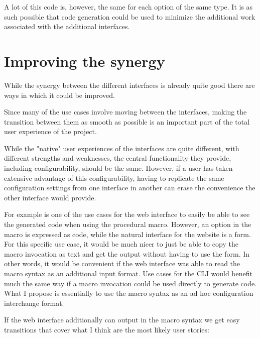 A lot of this code is, however, the same for each option of the same type. It is as such possible that code generation could be used to minimize the additional work associated with the additional interfaces.



\section{Improving the synergy}
\label{sec:improving-synergy}

While the synergy between the different interfaces is already quite good there are ways in which it could be improved.

Since many of the use cases involve moving between the interfaces, making the transition between them as smooth as possible is an important part of the total user experience of the project.

While the "native" user experiences of the interfaces are quite different, with different strengths and weaknesses, the central functionality they provide, including configurability, should be the same. However, if a user has taken extensive advantage of this configurability, having to replicate the same configuration settings from one interface in another can erase the convenience the other interface would provide.

For example is one of the use cases for the web interface to easily be able to see the generated code when using the procedural macro. However, an option in the macro is expressed as code, while the natural interface for the website is a form. For this specific use case, it would be much nicer to just be able to copy the macro invocation as text and get the output without having to use the form. In other words, it would be convenient if the web interface was able to read the macro syntax as an additional input format. Use cases for the CLI would benefit much the same way if a macro invocation could be used directly to generate code. What I propose is essentially to use the macro syntax as an ad hoc configuration interchange format.

If the web interface additionally can output in the macro syntax we get easy transitions that cover what I think are the most likely user stories:

